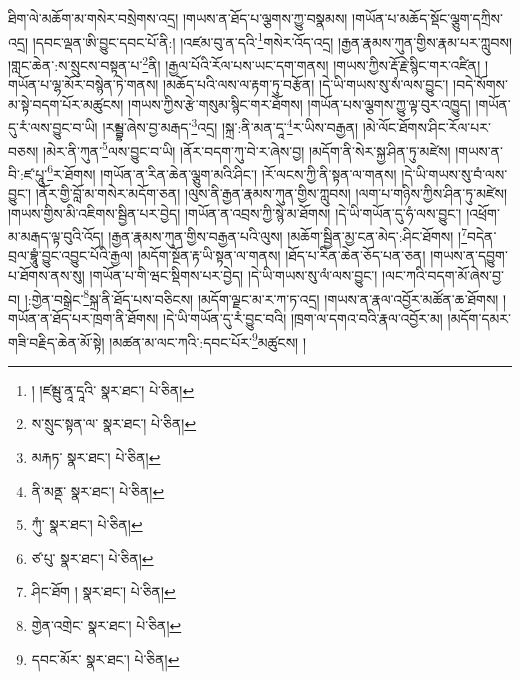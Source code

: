 ཐིག་ལེ་མཆོག་མ་གསེར་བསྲེགས་འདྲ། །གཡས་ན་ཐོད་པ་ལྕགས་ཀྱུ་བསྣམས། །གཡོན་པ་མཆོད་སྡོང་ལྕུག་དཀྲིས་འདྲ། །དབང་ལྡན་ཨི་བྱུང་དབང་པོ་ནི:། །འཛམ་བུ་ན་དའི་\footnote{། །ཛམྦུ་ནཱ་དཱའི་  སྣར་ཐང་།  པེ་ཅིན། }གསེར་འོད་འདྲ། །རྒྱན་རྣམས་ཀུན་གྱིས་རྣམ་པར་ཀླུབས། །གླང་ཆེན་:ས་སྲུངས་བསྟན་པ་\footnote{ས་སྲུང་སྟན་ལ་  སྣར་ཐང་།  པེ་ཅིན། }ནི། །རྒྱལ་པོའི་རོལ་པས་ཡང་དག་གནས། །གཡས་ཀྱིས་རྡོ་རྗེ་སྙིང་གར་འཛིན། །གཡོན་པ་ལྷ་མོར་བསྙེན་ཏེ་གནས། །མཆོད་པའི་ལས་ལ་རྟག་ཏུ་བརྩོན། །དེ་ཡི་གཡས་སུ་སཾ་ལས་བྱུང་། །བདེ་སོགས་མ་སྟེ་བདག་པོར་མཚུངས། །གཡས་ཀྱིས་རྩེ་གསུམ་སྙིང་གར་ཐོགས། །གཡོན་པས་ལྕགས་ཀྱུ་ལྟ་བུར་འཁྱུད། །གཡོན་དུ་རཾ་ལས་བྱུང་བ་ཡི། །རམྦྷ་ཞེས་བྱ་མརྒད་\footnote{མརྐཏ་  སྣར་ཐང་།  པེ་ཅིན། }འདྲ། །སྐྲ་:ནི་མན་དཱ་\footnote{ནི་མནྡ་  སྣར་ཐང་།  པེ་ཅིན། }ར་ཡིས་བརྒྱན། །མེ་ལོང་ཐོགས་ཤིང་རོལ་པར་བཅས། །མེར་ནི་ཀུན་\footnote{ཀུཾ་  སྣར་ཐང་།  པེ་ཅིན། }ལས་བྱུང་བ་ཡི། །ནོར་བདག་ཀུ་བེ་ར་ཞེས་བྱ། །མདོག་ནི་སེར་སྐྱ་ཤིན་ཏུ་མཛེས། །གཡས་ན་བི་:ཛ་པཱུ་\footnote{ཙ་པུ་  སྣར་ཐང་།  པེ་ཅིན། }ར་ཐོགས། །གཡོན་ན་རིན་ཆེན་ལྕུག་མའི་ཤིང་། །རོ་ལངས་ཀྱི་ནི་སྟན་ལ་གནས། །དེ་ཡི་གཡས་སུ་བཾ་ལས་བྱུང་། །ནོར་གྱི་བློ་མ་གསེར་མདོག་ཅན། །ལུས་ནི་རྒྱན་རྣམས་ཀུན་གྱིས་ཀླུབས། །ལག་པ་གཉིས་ཀྱིས་ཤིན་ཏུ་མཛེས། །གཡས་གྱིས་མི་འཇིགས་སྦྱིན་པར་བྱེད། །གཡོན་ན་འབྲས་ཀྱི་སྙེ་མ་ཐོགས། །དེ་ཡི་གཡོན་དུ་ཧཾ་ལས་བྱུང་། །འཕྲོག་མ་མརྒད་ལྟ་བུའི་འོད། །རྒྱན་རྣམས་ཀུན་གྱིས་བརྒྱན་པའི་ལུས། །མཆོག་སྦྱིན་མྱ་ངན་མེད་:ཤིང་ཐོགས། །\footnote{ཤིང་ཐོག །  སྣར་ཐང་།  པེ་ཅིན། }བདེན་བྲལ་བྷཱུཾ་བྱུང་འབྱུང་པོའི་རྒྱལ། །མདོག་སྔོན་རྟ་ཡི་སྟན་ལ་གནས། །ཐོད་པ་རིན་ཆེན་ཅོད་པན་ཅན། །གཡས་ན་དབྱུག་པ་ཐོགས་ནས་སུ། །གཡོན་པ་གི་ཝང་སྡིགས་པར་བྱེད། །དེ་ཡི་གཡས་སུ་ལཾ་ལས་བྱུང་། །ལང་ཀའི་བདག་མོ་ཞེས་བྱ་བ། །:གྱེན་བསྒྲེང་\footnote{གྱེན་འགྲེང་  སྣར་ཐང་།  པེ་ཅིན། }སྐྲ་ནི་ཐོད་པས་བཅིངས། །མདོག་ལྗང་མ་ར་ཀ་ཏ་འདྲ། །གཡས་ན་རྣལ་འབྱོར་མཚོན་ཆ་ཐོགས། །གཡོན་ན་ཐོད་པར་ཁྲག་ནི་ཐོགས། །དེ་ཡི་གཡོན་དུ་རཾ་བྱུང་བའི། །ཁྲག་ལ་དགའ་བའི་རྣལ་འབྱོར་མ། །མདོག་དམར་གཟི་བརྗིད་ཆེན་མོ་སྟེ། །མཚན་མ་ལང་ཀའི་:དབང་པོར་\footnote{དབང་མོར་  སྣར་ཐང་།  པེ་ཅིན། }མཚུངས། །
